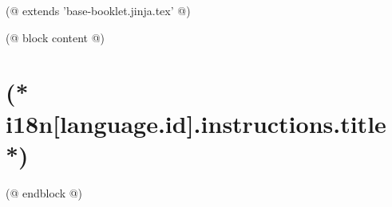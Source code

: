(@ extends 'base-booklet.jinja.tex' @)

(@ block content @)
    \pagestyle{instructions}

    \section{(* i18n[language.id].instructions.title *)}
    
(@ endblock @)
